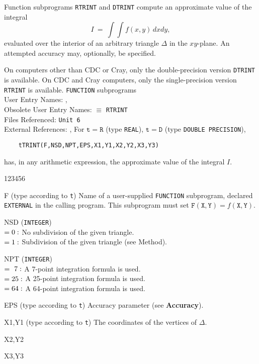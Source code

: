                                
                          
\Submitter{}                                     
                         
Function subprograms {\tt RTRINT} and {\tt DTRINT}
compute an approximate value of the integral
$$ I \ = \ \int \! \int f(x,y)\,dx dy, $$
evaluated over the interior of an arbitrary triangle $\Delta$ in the
$xy$-plane. An attempted accuracy may, optionally, be specified.
\par
On computers other than CDC or Cray, only
the double-precision version {\tt DTRINT} is available.
On CDC and  Cray computers, only the single-precision version
{\tt RTRINT} is available.
\Structure
{\tt FUNCTION} subprograms\\
User Entry Names: , \\
Obsolete User Entry Names:  $\equiv$ {\tt RTRINT} \\
Files Referenced: {\tt Unit 6} \\
External References: , 
\Usage
For $\mathtt{t=R}$ (type {\tt REAL}), $\mathtt{t=D}$ (type
{\tt DOUBLE PRECISION}),
\begin{verbatim}
    tTRINT(F,NSD,NPT,EPS,X1,Y1,X2,Y2,X3,Y3)
\end{verbatim}
has, in any arithmetic expression, the approximate value of the
integral $I$.
\begin{DLtt}{123456}
\item [F] (type according to {\tt t})
Name of a user-supplied {\tt FUNCTION} subprogram, declared
{\tt EXTERNAL} in the calling program. This subprogram must set
$\mathtt{F(X,Y)} = f(\mathtt{X,Y})$.
\item [NSD] ({\tt INTEGER}) \\
${\tt= 0:}$  No subdivision of the given triangle.\\
${\tt= 1:}$  Subdivision of the given triangle (see Method).
\item[NPT] ({\tt INTEGER}) \\
${\tt= \ 7:}$ A 7-point integration formula is used.\\
${\tt= 25:}$  A 25-point integration formula is used.\\
${\tt= 64:}$  A 64-point integration formula is used.
\item[EPS] (type according to {\tt t}) Accuracy parameter
(see {\bf Accuracy}).
\item[X1,Y1] (type according to {\tt t}) The coordinates of the
vertices of $\Delta$.
\item[X2,Y2]
\item[X3,Y3]
\end{DLtt}
